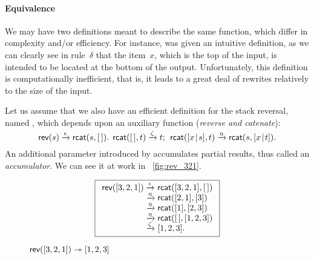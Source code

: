 \paragraph{Equivalence}

We may have two definitions meant to describe the same function, which
differ in complexity and/or efficiency. For instance,
 was given an intuitive
definition, as we can clearly see in rule~\(\delta\) that the
item~\(x\), which is the top of the input, is intended to be located
at the bottom of the output. Unfortunately, this definition is
computationally inefficient, that is, it leads to a great deal of
rewrites relatively to the size of the input. 

Let us assume that we also have an efficient definition for the stack
reversal, named , which depends upon
an auxiliary function
(\emph{reverse and catenate}):
\begin{equation}
\textsf{rev}(s) \xrightarrow{\smash{\epsilon}} \textsf{rcat}(s,[\,]).\;\,
\textsf{rcat}([\,],t) \xrightarrow{\smash{\zeta}} t;\;\,
\textsf{rcat}([{x}\!\mid\!{s}],t) \xrightarrow{\smash{\eta}} 
                          \textsf{rcat}(s,[{x}\!\mid\!{t}]).
\label{def:rev}
\end{equation}
An additional parameter introduced by  accumulates partial
results, thus called an \emph{accumulator}. We can see it at work in
\fig~\vref{fig:rev_321}.
\begin{figure}
\begin{equation*}
\boxed{%
\begin{array}{r@{\;}l@{\;}l}
\fun{rev}([3,2,1])
& \xrightarrow{\smash{\epsilon}} & \fun{rcat}([3,2,1],\el)\\
& \xrightarrow{\smash{\eta}}     & \fun{rcat}([2,1],[3])\\
& \xrightarrow{\smash{\eta}}     & \fun{rcat}([1],[2,3])\\
& \xrightarrow{\smash{\eta}}     & \fun{rcat}(\el,[1,2,3])\\
& \xrightarrow{\smash{\zeta}}    & [1,2,3].
\end{array}}
\end{equation*}
\caption{\(\textsf{rev}([3,2,1]) \twoheadrightarrow [1,2,3]\)
\label{fig:rev_321}}
\end{figure}

